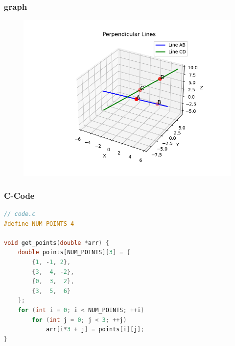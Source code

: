 \documentclass{beamer}
\begin{document}
\begin{frame}
\frametitle{graph}
\begin{figure}
    \centering
    \includegraphics[width=\linewidth]{figs/points.png}
    \caption{}
\end{figure}
\end{frame}

\begin{frame}[fragile]
\frametitle{C-Code}
\begin{lstlisting}[language=C]
// code.c
#define NUM_POINTS 4

void get_points(double *arr) {
    double points[NUM_POINTS][3] = {
        {1, -1, 2},
        {3,  4, -2},
        {0,  3,  2},
        {3,  5,  6}
    };
    for (int i = 0; i < NUM_POINTS; ++i)
        for (int j = 0; j < 3; ++j)
            arr[i*3 + j] = points[i][j];
}

 \end{lstlisting}
\end{frame}
\end{document}
